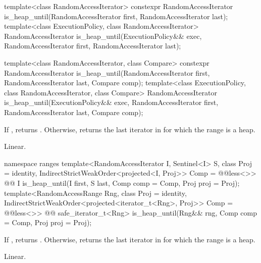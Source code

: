 %
\begin{itemdecl}
template<class RandomAccessIterator>
  constexpr RandomAccessIterator
    is_heap_until(RandomAccessIterator first, RandomAccessIterator last);
template<class ExecutionPolicy, class RandomAccessIterator>
  RandomAccessIterator
    is_heap_until(ExecutionPolicy&& exec,
                  RandomAccessIterator first, RandomAccessIterator last);

template<class RandomAccessIterator, class Compare>
  constexpr RandomAccessIterator
    is_heap_until(RandomAccessIterator first, RandomAccessIterator last,
                  Compare comp);
template<class ExecutionPolicy, class RandomAccessIterator, class Compare>
  RandomAccessIterator
    is_heap_until(ExecutionPolicy&& exec,
                  RandomAccessIterator first, RandomAccessIterator last,
                  Compare comp);
\end{itemdecl}

\begin{itemdescr}
\pnum
\returns If , returns
. Otherwise, returns
the last iterator  in  for which the
range  is a heap.

\pnum
\complexity Linear.
\end{itemdescr}

\begin{addedblock}
%
\begin{itemdecl}
namespace ranges {
  template<RandomAccessIterator I, Sentinel<I> S, class Proj = identity,
      IndirectStrictWeakOrder<projected<I, Proj>> Comp = @@less<>>
    @@ I is_heap_until(I first, S last, Comp comp = Comp{}, Proj proj = Proj{});
  template<RandomAccessRange Rng, class Proj = identity,
      IndirectStrictWeakOrder<projected<iterator_t<Rng>, Proj>> Comp = @@less<>>
    @@ safe_iterator_t<Rng>
      is_heap_until(Rng&& rng, Comp comp = Comp{}, Proj proj = Proj{});
}
\end{itemdecl}

\begin{itemdescr}
\pnum
\returns If , returns
. Otherwise, returns
the last iterator  in  for which the
range  is a heap.

\pnum
\complexity Linear.
\end{itemdescr}
\end{addedblock}

